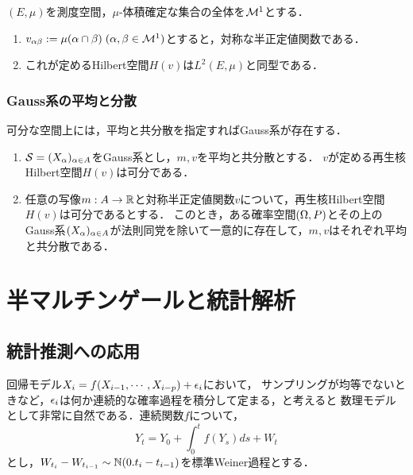 \documentclass[uplatex,dvipdfmx]{jsreport}
\begin{document}
\begin{theorem}
    $(E,\mu)$を測度空間，$\mu$-体積確定な集合の全体を$\mathcal{M}^1$とする．
    \begin{enumerate}
        \item $v_{\alpha\beta}:=\mu(\alpha\cap\beta)\;(\alpha,\beta\in\mathcal{M}^1)$とすると，対称な半正定値関数である．
        \item これが定めるHilbert空間$H(v)$は$L^2(E,\mu)$と同型である．
    \end{enumerate}
\end{theorem}

\subsection{Gauss系の平均と分散}

\begin{tcolorbox}[colframe=ForestGreen, colback=ForestGreen!10!white,breakable,colbacktitle=ForestGreen!40!white,coltitle=black,fonttitle=\bfseries\sffamily,
title=]
    可分な空間上には，平均と共分散を指定すればGauss系が存在する．
\end{tcolorbox}

\begin{theorem}\mbox{}
    \begin{enumerate}
        \item $\mathcal{S}=(X_\alpha)_{\alpha\in A}$をGauss系とし，$m,v$を平均と共分散とする．
        $v$が定める再生核Hilbert空間$H(v)$は可分である．
        \item 任意の写像$m:A\to\mathbb{R}$と対称半正定値関数$v$について，再生核Hilbert空間$H(v)$は可分であるとする．
        このとき，ある確率空間$(\Omega,P)$とその上のGauss系$(X_\alpha)_{\alpha\in A}$が法則同党を除いて一意的に存在して，$m,v$はそれぞれ平均と共分散である．
    \end{enumerate}
\end{theorem}

\chapter{半マルチンゲールと統計解析}

\section{統計推測への応用}

回帰モデル$X_i=f(X_{i-1},\cdots,X_{i-p})+\epsilon_i$において，
サンプリングが均等でないときなど，$\epsilon_i$は何か連続的な確率過程を積分して定まる，と考えると
数理モデルとして非常に自然である．連続関数$f$について，
\[Y_t=Y_0+\int^t_0f(Y_s)ds+W_t\]
とし，$W_{t_i}-W_{t_{i-1}}\sim\mathbb{N}(0.t_i-t_{i-1})$を標準Weiner過程とする．
\end{document}
